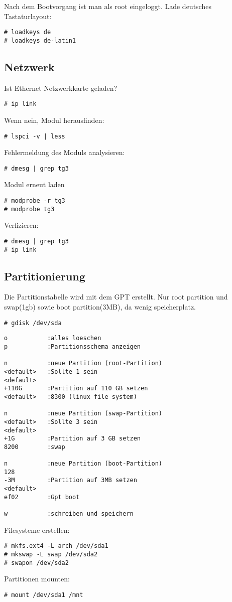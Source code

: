 Nach dem Bootvorgang ist man als root eingeloggt.
Lade deutsches Tastaturlayout:
\begin{lstlisting}[style=Bash]
# loadkeys de
# loadkeys de-latin1
\end{lstlisting}

\subsection{Netzwerk}
\label{subsec:network}
Ist Ethernet Netzwerkkarte geladen?
\begin{lstlisting}[style=Bash]
# ip link 
\end{lstlisting}
Wenn nein, Modul herausfinden:
\begin{lstlisting}[style=Bash]
# lspci -v | less 
\end{lstlisting}
Fehlermeldung des Moduls analysieren:
\begin{lstlisting}[style=Bash]
# dmesg | grep tg3 
\end{lstlisting}
Modul erneut laden
\begin{lstlisting}[style=Bash]
# modprobe -r tg3
# modprobe tg3
\end{lstlisting}
Verfizieren:
\begin{lstlisting}[style=Bash]
# dmesg | grep tg3 
# ip link
\end{lstlisting}

\subsection{Partitionierung}
\label{subsec:partitioning}
Die Partitionstabelle wird mit dem GPT erstellt.
Nur root partition und swap(1gb) sowie boot partition(3MB), 
da wenig speicherplatz.

\begin{lstlisting}[style=Bash]
# gdisk /dev/sda
\end{lstlisting}
\begin{lstlisting}[style=gdisk]
o           :alles loeschen
p           :Partitionsschema anzeigen

n           :neue Partition (root-Partition)
<default>   :Sollte 1 sein
<default>     
+110G       :Partition auf 110 GB setzen
<default>   :8300 (linux file system)

n           :neue Partition (swap-Partition)
<default>   :Sollte 3 sein
<default>     
+1G         :Partition auf 3 GB setzen
8200        :swap

n           :neue Partition (boot-Partition)
128         
-3M         :Partition auf 3MB setzen
<default>   
ef02        :Gpt boot

w           :schreiben und speichern
\end{lstlisting}
Filesysteme erstellen:
\begin{lstlisting}[style=Bash]
# mkfs.ext4 -L arch /dev/sda1
# mkswap -L swap /dev/sda2
# swapon /dev/sda2
\end{lstlisting}
Partitionen mounten:
\begin{lstlisting}[style=Bash]
# mount /dev/sda1 /mnt 
\end{lstlisting}

